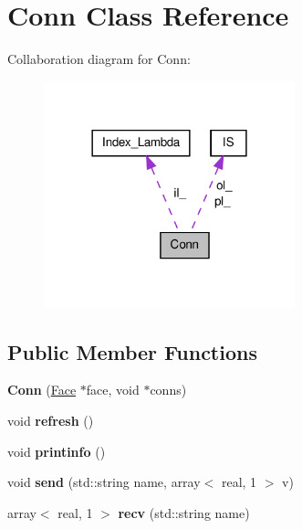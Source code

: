 \hypertarget{classConn}{\section{Conn Class Reference}
\label{classConn}
}


Collaboration diagram for Conn\-:\nopagebreak
\begin{figure}[H]
\begin{center}
\leavevmode
\includegraphics[width=206pt]{classConn__coll__graph}
\end{center}
\end{figure}
\subsection*{Public Member Functions}
\begin{DoxyCompactItemize}
\item 
\hypertarget{classConn_ac40aeea0b86744e9e6a8634c1a2ccbe7}{{\bfseries Conn} (\hyperlink{classFace}{Face} $\ast$face, void $\ast$conns)}\label{classConn_ac40aeea0b86744e9e6a8634c1a2ccbe7}

\item 
\hypertarget{classConn_af3776731e374e856bb5eac3faea03ae3}{void {\bfseries refresh} ()}\label{classConn_af3776731e374e856bb5eac3faea03ae3}

\item 
\hypertarget{classConn_add96cc92a7575634f44220cb6e2e2421}{void {\bfseries printinfo} ()}\label{classConn_add96cc92a7575634f44220cb6e2e2421}

\item 
\hypertarget{classConn_ace36b6085ceadcfa9654b5950e7719c0}{void {\bfseries send} (std\-::string name, array$<$ real, 1 $>$ v)}\label{classConn_ace36b6085ceadcfa9654b5950e7719c0}

\item 
\hypertarget{classConn_ad0ba346867084d28da983b5785934df5}{array$<$ real, 1 $>$ {\bfseries recv} (std\-::string name)}\label{classConn_ad0ba346867084d28da983b5785934df5}

\end{DoxyCompactItemize}
